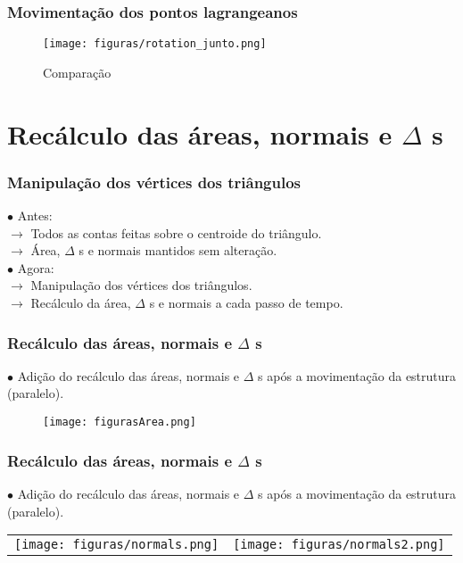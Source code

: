 \documentclass[xcolor=dvipsnames,10pt,aspectratio=169]{beamer}
\begin{document}
	
		\begin{frame}
			\frametitle{Movimentação dos pontos lagrangeanos}
			\begin{figure}[!ht]
				\centerline{\texttt{[image: figuras/rotation\_junto.png]}}
				\caption{ Comparação }
			\end{figure}

		\end{frame}
	
	\section{ Recálculo das áreas, normais e $\Delta$ s }
	
		\begin{frame}
			\frametitle{Manipulação dos vértices dos triângulos}
			$\bullet$ Antes:\\
				$\longrightarrow$	Todos as contas feitas sobre o centroide do triângulo.\\
				$\longrightarrow$	Área, $\Delta$ s e normais mantidos sem alteração.\\

			$\bullet$ Agora: \\
				$\longrightarrow$ Manipulação dos vértices dos triângulos.\\
				$\longrightarrow$ Recálculo da área, $\Delta$ s e normais a cada passo de tempo.\\
			
		\end{frame}	
		\begin{frame}
			\frametitle{Recálculo das áreas, normais e $\Delta$ s}
			$\bullet$ Adição do recálculo das áreas, normais e $\Delta$ s após a movimentação da estrutura (paralelo).\\

			\begin{figure}[!ht]
				\centerline{\texttt{[image: figurasArea.png]}}

			\end{figure}


		\end{frame}
	
		\begin{frame}
			\frametitle{Recálculo das áreas, normais e $\Delta$ s}
			$\bullet$ Adição do recálculo das áreas, normais e $\Delta$ s após a movimentação da estrutura (paralelo).\\
			\centering
			\begin{tabular}{c c}
				
				{\texttt{[image: figuras/normals.png]}}&{\texttt{[image: figuras/normals2.png]}}

			\end{tabular}
			
			
		\end{frame}
		
\end{document}
